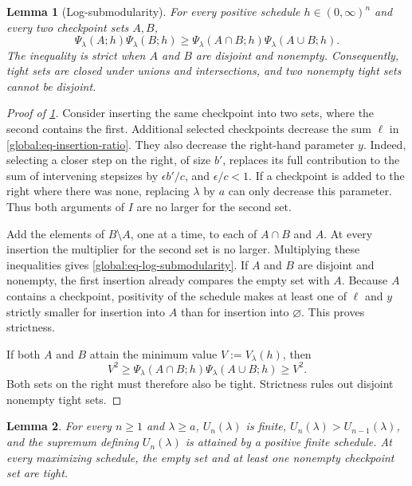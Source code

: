 \documentclass[11pt,letterpaper]{article}
\newtheorem{lemma}[lemma]{Lemma}
\theoremstyle{definition}
\begin{document}
\begin{lemma}[Log-submodularity]
\label{global:lem-log-submodularity}
For every positive schedule $h\in(0,\infty)^n$ and every two checkpoint sets $A,B$,
\begin{equation}
  \Psi_\lambda(A;h)\Psi_\lambda(B;h)
  \ge\Psi_\lambda(A\cap B;h)\Psi_\lambda(A\cup B;h).
  \label{global:eq-log-submodularity}
\end{equation}
The inequality is strict when $A$ and $B$ are disjoint and nonempty.
Consequently, tight sets are closed under unions and intersections, and two nonempty tight sets cannot be disjoint.
\end{lemma}

\begin{proof}[Proof of \cref{global:lem-log-submodularity}]
Consider inserting the same checkpoint into two sets, where the second contains the first.
Additional selected checkpoints decrease the sum $\ell$ in \eqref{global:eq-insertion-ratio}.
They also decrease the right-hand parameter $y$.
Indeed, selecting a closer step on the right, of size $b'$, replaces its full contribution to the sum of intervening stepsizes by $\epsilon b'/c$, and $\epsilon/c<1$.
If a checkpoint is added to the right where there was none, replacing $\lambda$ by $a$ can only decrease this parameter.
Thus both arguments of $I$ are no larger for the second set.

Add the elements of $B\setminus A$, one at a time, to each of $A\cap B$ and $A$.
At every insertion the multiplier for the second set is no larger.
Multiplying these inequalities gives \eqref{global:eq-log-submodularity}.
If $A$ and $B$ are disjoint and nonempty, the first insertion already compares the empty set with $A$.
Because $A$ contains a checkpoint, positivity of the schedule makes at least one of $\ell$ and $y$ strictly smaller for insertion into $A$ than for insertion into $\varnothing$.
This proves strictness.

If both $A$ and $B$ attain the minimum value $V:=V_\lambda(h)$, then
\[
  V^2\ge\Psi_\lambda(A\cap B;h)\Psi_\lambda(A\cup B;h)\ge V^2.
\]
Both sets on the right must therefore also be tight.
Strictness rules out disjoint nonempty tight sets.
\end{proof}

\begin{lemma}
\label{global:lem-extremal-schedule}
For every $n\ge1$ and $\lambda\ge a$, $U_n(\lambda)$ is finite, $U_n(\lambda)>U_{n-1}(\lambda)$, and the supremum defining $U_n(\lambda)$ is attained by a positive finite schedule.
At every maximizing schedule, the empty set and at least one nonempty checkpoint set are tight.
\end{lemma}
\end{document}
